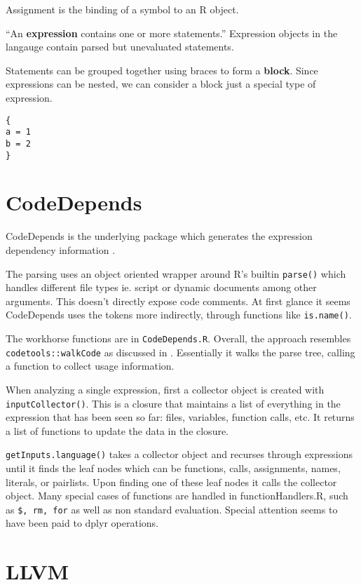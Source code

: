 \documentclass[12pt]{article}
\begin{document}
Assignment is the binding of a symbol to an R object.

``An \textbf{expression} contains one or more statements.'' Expression objects
in the langauge contain parsed but unevaluated statements. 

Statements can be grouped together using braces to form a \textbf{block}.
Since expressions can be nested, we can consider a block just a special
type of expression.

\begin{verbatim}
{
a = 1
b = 2
}
\end{verbatim}

\section{CodeDepends}

CodeDepends is the underlying package which generates the expression
dependency information \cite{R-CodeDepends}.

The parsing uses an object oriented wrapper around R's builtin \texttt{parse()}
which handles different file types ie. script or dynamic documents among other arguments.
This doesn't directly expose code comments.
At first glance it seems CodeDepends uses the tokens
more indirectly, through functions like \texttt{is.name()}. 

The workhorse functions are in \texttt{CodeDepends.R}. Overall, the
approach resembles \texttt{codetools::walkCode} as discussed in
\cite{chambers2016extending}. Essentially it walks the parse tree, calling
a function to collect usage information.

When analyzing a single expression, first a 
collector object is created with \texttt{inputCollector()}. This is a
closure that maintains a list of everything in the expression that has been seen
so far: files, variables, function calls, etc. It returns a list of
functions to update the data in the closure.

\texttt{getInputs.language()} takes a collector object and
recurses through expressions until it finds the leaf nodes which can be functions, calls, assignments,
names, literals, or pairlists. Upon finding one of these leaf nodes it
calls the collector object. 
Many special cases of functions are handled in functionHandlers.R, such as
\texttt{\$, rm, for} as well as non standard evaluation. Special attention seems
to have been paid to dplyr operations.


\section{LLVM}
\end{document}
